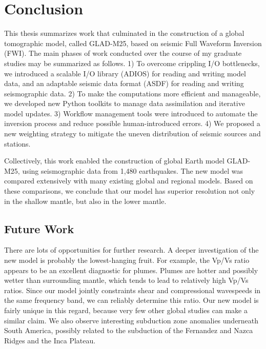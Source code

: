 \newpage
\chapter{Conclusion}
\label{ch:conclusion}

This thesis summarizes work that culminated in the construction of a global tomographic model,
called GLAD-M25, based on seismic Full Waveform Inversion (FWI).
The main phases of work conducted over the course of my graduate studies may be summarized as follows.
1) To overcome crippling I/O bottlenecks, we introduced a scalable I/O library (ADIOS) for reading and writing model data,
and an adaptable seismic data format (ASDF) for reading and writing seismographic data.
2) To make the computations more efficient and manageable,
we developed new Python toolkits to manage data assimilation and iterative model updates.
3) Workflow management tools were introduced to automate the inversion process and reduce possible
human-introduced errors.
4) We proposed a new weighting strategy to
mitigate the uneven distribution of seismic sources and stations.

Collectively, this work enabled the construction of global Earth model GLAD-M25,
using seismographic data from 1,480 earthquakes.
The new model was compared extensively with many existing global and regional models.
Based on these comparisons, we conclude that our model has superior resolution
not only in the shallow mantle, but also in the lower mantle.

\section{Future Work}

There are lots of opportunities for further research.
A deeper investigation of the new model is probably the lowest-hanging fruit.
For example, the Vp/Vs ratio appears to be an excellent diagnostic for plumes.
Plumes are hotter and possibly wetter than surrounding mantle, which tends to lead to relatively high Vp/Vs ratios.
Since our model jointly constraints shear and compressional wavespeeds in the same frequency band,
we can reliably determine this ratio.
Our new model is fairly unique in this regard,
because very few other global studies can make a similar claim.
We also observe interesting subduction zone anomalies underneath South America,
possibly related to the subduction of the Fernandez and Nazca Ridges and the Inca Plateau.


